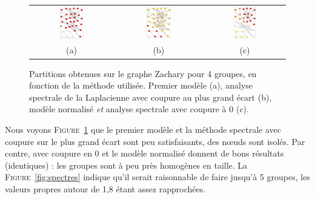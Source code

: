 \documentclass[12pt]{article}
\newcommand{\fig}[1]{\textsc{Figure}~\ref{#1}}
\begin{document}
\begin{figure}[bth]
	\begin{center}
		\begin{tabular}[h]{ccc}
		\includegraphics[width=0.30\textwidth]{new_plots/za-m1}&
		\includegraphics[width=0.30\textwidth]{new_plots/za-sp-ge}&
		\includegraphics[width=0.30\textwidth]{new_plots/za-m2}
		\\
		(a) & (b) & (c)
		\end{tabular}
	\end{center}
	\caption{Partitions obtenues sur le graphe Zachary pour 4 groupes, en fonction de la méthode utilisée. Premier modèle (a),
	analyse spectrale de la Laplacienne avec coupure au plus grand écart (b), modèle normalisé \emph{et} analyse spectrale avec
	coupure à 0 (c).}
	\label{fig:partitions-za}
\end{figure}

Nous voyons \fig{fig:partitions-za} que le premier modèle et la méthode spectrale avec coupure sur le plus grand écart sont peu
satisfaisants, des n\oe uds sont isolés. Par contre, avec coupure en 0 et le modèle normalisé donnent de bons résultats
(identiques) : les groupes sont à peu près homogènes en taille. 
La \fig{fig:spectres} indique qu'il serait raisonnable de faire jusqu'à 5 groupes, les valeurs propres autour de 1,8 étant assez
rapprochées.
\end{document}
